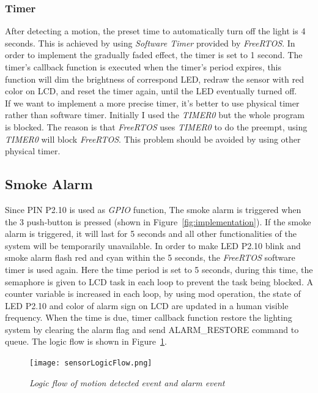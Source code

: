 \subsubsection{Timer}
After detecting a motion, the preset time to automatically turn off the light is 4 seconds. This is achieved by using \textit{Software Timer} provided by \textit{FreeRTOS}. In order to implement the gradually faded effect, the timer is set to 1 second. The timer's callback function is executed when the timer's period expires, this function will dim the brightness of correspond LED, redraw the sensor with red color on LCD, and reset the timer again, until the LED eventually turned off.\\

If we want to implement a more precise timer, it's better to use physical timer rather than software timer. Initially I used the \textit{TIMER0} but the whole program is blocked. The reason is that \textit{FreeRTOS} uses \textit{TIMER0} to do the preempt, using \textit{TIMER0} will block \textit{FreeRTOS}. This problem should be avoided by using other physical timer.

\subsection{Smoke Alarm}
Since PIN P2.10 is used as \textit{GPIO} function, The smoke alarm is triggered when the 3 push-button is pressed (shown in Figure~\ref{fig:implementation}). If the smoke alarm is triggered, it will last for 5 seconds and all other functionalities of the system will be temporarily unavailable. In order to make LED P2.10 blink and smoke alarm flash red and cyan within the 5 seconds, the \textit{FreeRTOS} software timer is used again. Here the time period is set to 5 seconds, during this time, the semaphore is given to LCD task in each loop to prevent the task being blocked. A counter variable is increased in each loop, by using mod operation, the state of LED P2.10 and color of alarm sign on LCD are updated in a human visible frequency. When the time is due, timer callback function restore the lighting system by clearing the alarm flag and send ALARM\_RESTORE command to queue. The logic flow is shown in Figure~\ref{fig:sensorLogicFlow}.

\begin{figure}%
\centering
\texttt{[image: sensorLogicFlow.png]}
\caption{\label{fig:sensorLogicFlow}\textit{Logic flow of motion detected event and alarm event}}
\end{figure}

